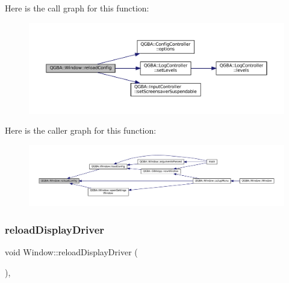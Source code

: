 Here is the call graph for this function\+:
\nopagebreak
\begin{figure}[H]
\begin{center}
\leavevmode
\includegraphics[width=350pt]{class_q_g_b_a_1_1_window_aad41987baa475389a724b96d53183db2_cgraph}
\end{center}
\end{figure}
Here is the caller graph for this function\+:
\nopagebreak
\begin{figure}[H]
\begin{center}
\leavevmode
\includegraphics[width=350pt]{class_q_g_b_a_1_1_window_aad41987baa475389a724b96d53183db2_icgraph}
\end{center}
\end{figure}
\mbox{\label{class_q_g_b_a_1_1_window_a01573d875972842fe908b15797ce1e06}} 
\subsubsection{\texorpdfstring{reload\+Display\+Driver}{reloadDisplayDriver}}
{\footnotesize\ttfamily void Window\+::reload\+Display\+Driver (\begin{DoxyParamCaption}{ }\end{DoxyParamCaption})\hspace{0.3cm}{\ttfamily [private]}, {\ttfamily [slot]}}

